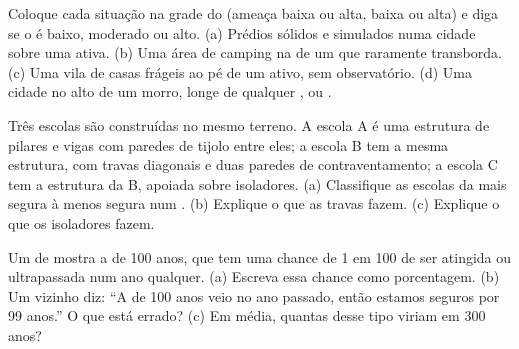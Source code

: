 \begin{exercise}[$\star\star$]\label{exo:g9:natural-risks:7}
Coloque cada situação na grade do  (ameaça baixa ou alta,
 baixa ou alta) e diga se o  é baixo, moderado ou
alto. (a) Prédios sólidos e simulados numa cidade sobre uma  ativa.
(b) Uma área de camping na  de um  que raramente
transborda. (c) Uma vila de casas frágeis ao pé de um  ativo, sem
observatório. (d) Uma cidade no alto de um morro, longe de qualquer
,  ou .
\end{exercise}

\begin{exercise}[$\star\star$]\label{exo:g9:natural-risks:8}
Três escolas são construídas no mesmo terreno. A escola A é uma estrutura
de pilares e vigas com paredes de tijolo entre eles; a escola B tem a
mesma estrutura, com travas diagonais e duas paredes de contraventamento;
a escola C tem a estrutura da B, apoiada sobre isoladores. (a) Classifique
as escolas da mais segura à menos segura num . (b) Explique o
que as travas fazem. (c) Explique o que os isoladores fazem.
\end{exercise}

\begin{exercise}[$\star\star$]\label{exo:g9:natural-risks:9}
Um  de  mostra a  de 100 anos, que tem uma chance
de 1 em 100 de ser atingida ou ultrapassada num ano qualquer. (a)
Escreva essa chance como porcentagem. (b) Um vizinho diz: ``A 
de 100 anos veio no ano passado, então estamos seguros por 99 anos.'' O
que está errado? (c) Em média, quantas  desse tipo viriam em
300 anos?
\end{exercise}

